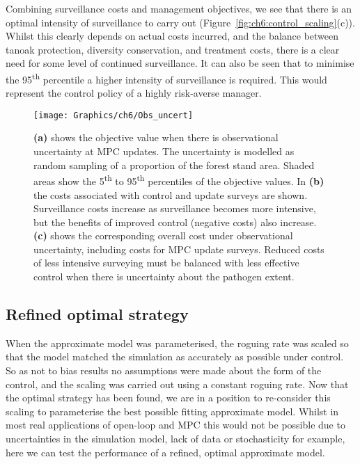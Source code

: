 Combining surveillance costs and management objectives, we see that there is an optimal intensity of surveillance to carry out (Figure~\ref{fig:ch6:control_scaling}(c)). Whilst this clearly depends on actual costs incurred, and the balance between tanoak protection, diversity conservation, and treatment costs, there is a clear need for some level of continued surveillance. It can also be seen that to minimise the 95\textsuperscript{th} percentile a higher intensity of surveillance is required. This would represent the control policy of a highly risk-averse manager.

\begin{figure}[t]
    \begin{center}
        \texttt{[image: Graphics/ch6/Obs\_uncert]}
        \caption[Performance of MPC under observational uncertainty]{\textbf{(a)} shows the objective value when there is observational uncertainty at MPC updates. The uncertainty is modelled as random sampling of a proportion of the forest stand area. Shaded areas show the 5\textsuperscript{th} to 95\textsuperscript{th} percentiles of the objective values. In \textbf{(b)} the costs associated with control and update surveys are shown. Surveillance costs increase as surveillance becomes more intensive, but the benefits of improved control (negative costs) also increase. \textbf{(c)} shows the corresponding overall cost under observational uncertainty, including costs for MPC update surveys. Reduced costs of less intensive surveying must be balanced with less effective control when there is uncertainty about the pathogen extent.\label{fig:ch6:obs_uncert}}
    \end{center}
\end{figure}

\FloatBarrier
\subsection{Refined optimal strategy}

When the approximate model was parameterised, the roguing rate was scaled so that the model matched the simulation as accurately as possible under control. So as not to bias results no assumptions were made about the form of the control, and the scaling was carried out using a constant roguing rate. Now that the optimal strategy has been found, we are in a position to re-consider this scaling to parameterise the best possible fitting approximate model. Whilst in most real applications of open-loop and MPC this would not be possible due to uncertainties in the simulation model, lack of data or stochasticity for example, here we can test the performance of a refined, optimal approximate model.

